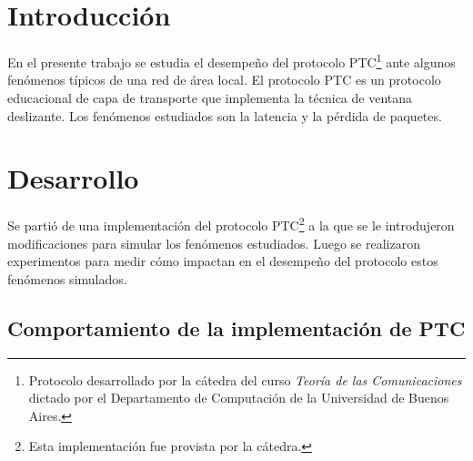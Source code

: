 \documentclass[a4paper, 10pt, twoside]{article}
\begin{document}
\newpage




\tableofcontents

\newpage




\section{Introducción}
\label{sec:introduccion}


En el presente trabajo se estudia el desempeño del protocolo PTC\footnote{Protocolo desarrollado por la cátedra del curso \emph{Teoría de las Comunicaciones} dictado por el Departamento de Computación de la Universidad de Buenos Aires.} ante algunos fenómenos típicos de una red de área local. El protocolo PTC es un protocolo educacional de capa de transporte que implementa la técnica de ventana deslizante. Los fenómenos estudiados son la latencia y la pérdida de paquetes.




\section{Desarrollo}
\label{sec:desarrollo}

Se partió de una implementación del protocolo PTC\footnote{Esta implementación fue provista por la cátedra.} a la que se le introdujeron modificaciones para simular los fenómenos estudiados. Luego se realizaron experimentos para medir cómo impactan en el desempeño del protocolo estos fenómenos simulados.


\subsection{Comportamiento de la implementación de PTC}
\end{document}
